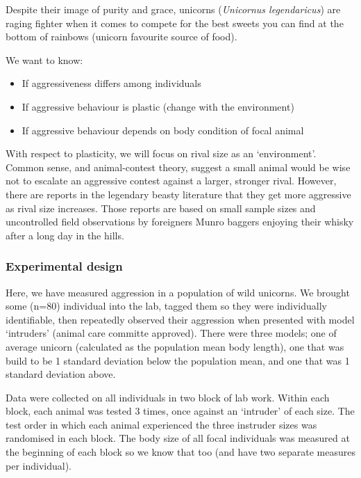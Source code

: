 \documentclass[
  12pt,
]{book}
\providecommand{\tightlist}{%
  \setlength{\itemsep}{0pt}\setlength{\parskip}{0pt}}
\begin{document}
Despite their image of purity and grace, unicorns (\emph{Unicornus legendaricus}) are raging fighter when it comes to compete for the best sweets you can find at the bottom of rainbows (unicorn favourite source of food).

We want to know:

\begin{itemize}
\tightlist
\item
  If aggressiveness differs among individuals
\item
  If aggressive behaviour is plastic (change with the environment)
\item
  If aggressive behaviour depends on body condition of focal animal
\end{itemize}

With respect to plasticity, we will focus on rival size as an `environment'. Common sense, and animal-contest theory, suggest a small animal would be wise not to escalate an aggressive contest against a larger, stronger rival. However, there are reports in the legendary beasty literature that they get more aggressive as rival size increases. Those reports are based on small sample sizes and uncontrolled field observations by foreigners Munro baggers enjoying their whisky after a long day in the hills.

\hypertarget{experimental-design}{%
\subsubsection{Experimental design}\label{experimental-design}}

Here, we have measured aggression in a population of wild unicorns. We brought some (n=80) individual into the lab, tagged them so they were individually identifiable, then repeatedly observed their aggression when presented with model `intruders' (animal care committe approved). There were three models; one of average unicorn (calculated as the population mean body length), one that was build to be 1 standard deviation below the population mean, and one that was 1 standard deviation above.

Data were collected on all individuals in two block of lab work. Within each block, each animal was tested 3 times, once against an `intruder' of each size. The test order in which each animal experienced the three instruder sizes was randomised in each block. The body size of all focal individuals was measured at the beginning of each block so we know that too (and have two separate measures per individual).
\end{document}
